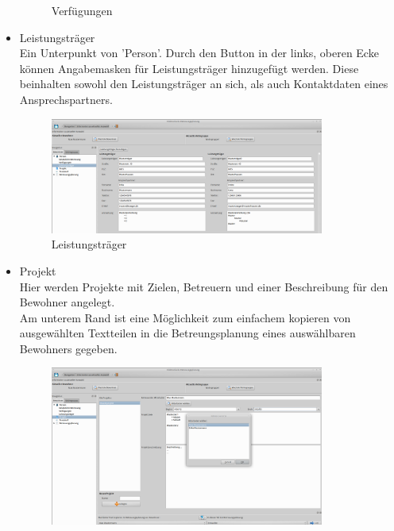 \begin{itemize}
\begin{figure}[h!]
\begin{center}
			\caption{Verfügungen}
		\end{center}
	\end{figure}
	\FloatBarrier
	\item Leistungsträger\mbox{}\\
	\noindent
	Ein Unterpunkt von 'Person'. Durch den Button in der links, oberen Ecke können Angabemasken für Leistungsträger hinzugefügt werden. Diese beinhalten sowohl den Leistungsträger an sich, als auch Kontaktdaten eines Ansprechspartners.
	\begin{figure}[h!]
		\begin{center}
			\includegraphics[keepaspectratio=true, width=0.85\textwidth]{pics/client_leistungstraeger.png}
			\caption{Leistungsträger}
		\end{center}
	\end{figure}
	\FloatBarrier
	\newpage
	\item Projekt\mbox{}\\
	\noindent
	Hier werden Projekte mit Zielen, Betreuern und einer Beschreibung für den Bewohner angelegt.\\ Am unterem Rand ist eine Möglichkeit zum einfachem kopieren von ausgewählten Textteilen in die Betreungsplanung eines auswählbaren Bewohners gegeben.
	\begin{figure}[h!]
		\begin{center}
			\includegraphics[keepaspectratio=true, width=0.85\textwidth]{pics/client_projekt.png}

\end{center}
\end{figure}
\end{itemize}
